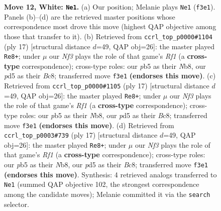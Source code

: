\documentclass[11pt]{article}
\begin{document}
\begin{figure}[p]
\caption{\textbf{Move 12, White: \texttt{Ne1}.} (a) Our position; Melanie plays \texttt{Ne1} (\texttt{f3e1}). Panels (b)--(d) are the retrieved master positions whose correspondence most drove this move (highest QAP objective among those that transfer to it). (b) Retrieved from \texttt{ccrl\_top\_p0000\#1104} (ply 17) [structural distance $d$=49, QAP obj=26]: the master played \texttt{Re8+}; under $\mu$ our \emph{Nf3} plays the role of that game's \emph{Rf1} (a \textbf{cross-type} correspondence); cross-type roles: our \emph{p}b5 as their \emph{N}b8, our \emph{p}d5 as their \emph{B}c8; transferred move \texttt{f3e1} \textbf{(endorses this move)}. (c) Retrieved from \texttt{ccrl\_top\_p0000\#1105} (ply 17) [structural distance $d$=49, QAP obj=26]: the master played \texttt{Re8+}; under $\mu$ our \emph{Nf3} plays the role of that game's \emph{Rf1} (a \textbf{cross-type} correspondence); cross-type roles: our \emph{p}b5 as their \emph{N}b8, our \emph{p}d5 as their \emph{B}c8; transferred move \texttt{f3e1} \textbf{(endorses this move)}. (d) Retrieved from \texttt{ccrl\_top\_p0003\#739} (ply 17) [structural distance $d$=49, QAP obj=26]: the master played \texttt{Re8+}; under $\mu$ our \emph{Nf3} plays the role of that game's \emph{Rf1} (a \textbf{cross-type} correspondence); cross-type roles: our \emph{p}b5 as their \emph{N}b8, our \emph{p}d5 as their \emph{B}c8; transferred move \texttt{f3e1} \textbf{(endorses this move)}. Synthesis: 4 retrieved analogs transferred to \texttt{Ne1} (summed QAP objective 102, the strongest correspondence among the candidate moves); Melanie committed it via the \texttt{search} selector.}
\label{fig:thought-m22}
\end{figure}

\clearpage
\end{document}
